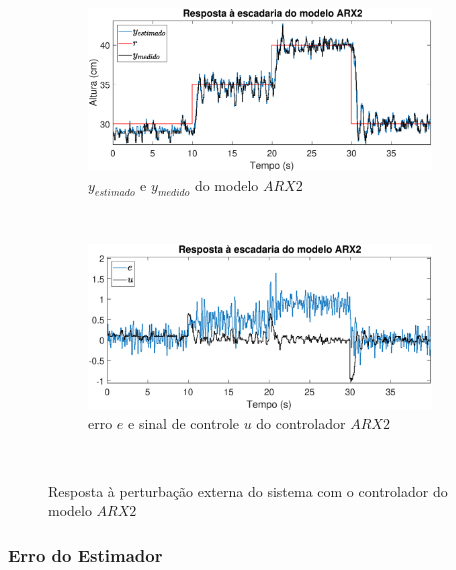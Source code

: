 \begin{figure}[H]
	\centering
	\begin{subfigure}[b]{1\textwidth}
		\includegraphics[width=1\linewidth]{stairrarx2y}
		\caption[$y_{estimado}$ e $y_{medido}$ do modelo $ARX2$]{$y_{estimado}$ e $y_{medido}$ do modelo $ARX2$}
		\label{fig:stairrarx2y}
	\end{subfigure}
	~ %
	\begin{subfigure}[b]{1\textwidth}
		\includegraphics[width=1\linewidth]{stairrarx2e}
		\caption[erro $e$ e sinal de controle $u$ do controlador $ARX2$]{erro $e$ e sinal de controle $u$ do controlador $ARX2$}
		\label{fig:stairrarx2e}
	\end{subfigure}
	~ %
	
	\caption{Resposta à perturbação externa do sistema com o controlador do modelo $ARX2$}\label{fig:stairrarx2}
\end{figure}

\subsubsection{Erro do Estimador} \label{erroest}

